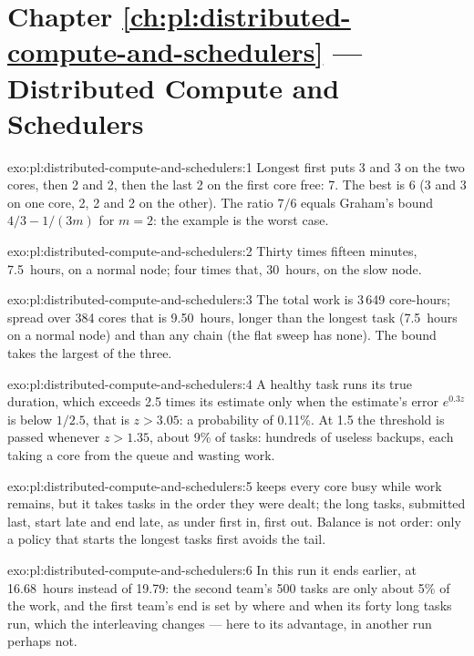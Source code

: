 \section*{Chapter \ref{ch:pl:distributed-compute-and-schedulers} --- Distributed Compute and Schedulers}

\begin{solution}{exo:pl:distributed-compute-and-schedulers:1}
Longest first puts 3 and 3 on the two cores, then 2 and 2, then the last 2 on the first core free: 7. The best is 6 (3 and 3 on one core, 2,
2 and 2 on the other). The ratio $7/6$ equals Graham's bound $4/3 - 1/(3m)$ for $m = 2$: the example is the worst case.
\end{solution}

\begin{solution}{exo:pl:distributed-compute-and-schedulers:2}
Thirty times fifteen minutes, 7.5~hours, on a normal node; four times that, 30~hours, on the slow node.
\end{solution}

\begin{solution}{exo:pl:distributed-compute-and-schedulers:3}
The total work is 3\,649 core-hours; spread over 384 cores that is 9.50~hours, longer than the longest task (7.5~hours on a normal node) and
than any chain (the flat sweep has none). The bound takes the largest of the three.
\end{solution}

\begin{solution}{exo:pl:distributed-compute-and-schedulers:4}
A healthy task runs its true duration, which exceeds 2.5 times its estimate only when the estimate's error $e^{0.3z}$ is below $1/2.5$, that is
$z > 3.05$: a probability of 0.11\%. At 1.5 the threshold is passed whenever $z > 1.35$, about 9\% of tasks: hundreds of useless backups,
each taking a core from the queue and wasting work.
\end{solution}

\begin{solution}{exo:pl:distributed-compute-and-schedulers:5}
 keeps every core busy while work remains, but it takes tasks in the order they were dealt; the long tasks, submitted last, start
late and end late, as under first in, first out. Balance is not order: only a policy that starts the longest tasks first avoids the tail.
\end{solution}

\begin{solution}{exo:pl:distributed-compute-and-schedulers:6}
In this run it ends earlier, at 16.68~hours instead of 19.79: the second team's 500 tasks are only about 5\% of the work, and the first
team's end is set by where and when its forty long tasks run, which the interleaving changes --- here to its advantage, in another run
perhaps not.
\end{solution}

